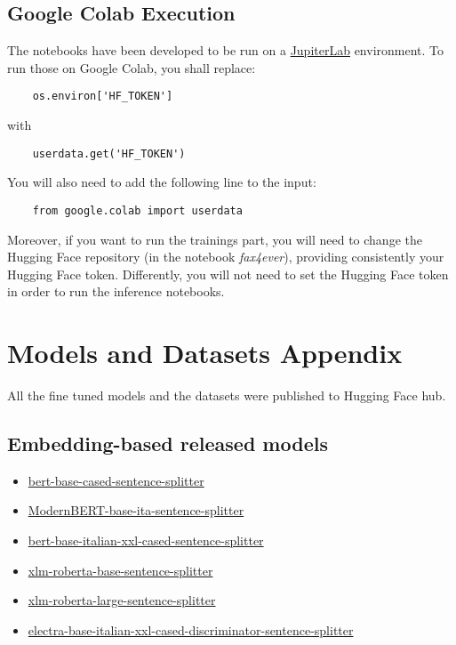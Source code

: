 \documentclass[11pt]{article}
\begin{document}
\subsection{Google Colab Execution}
The notebooks have been developed to be run on a \href{https://jupyterlab.readthedocs.io/en/latest/#}{JupiterLab}
environment. \newline To run those on Google Colab, you shall replace:
\begin{verbatim}
	os.environ['HF_TOKEN']
\end{verbatim}

with

\begin{verbatim}
	userdata.get('HF_TOKEN')
\end{verbatim}
You will also need to add the following line to the input:
\begin{verbatim}
	from google.colab import userdata
\end{verbatim}
Moreover, if you want to run the trainings part, you will need to change the Hugging Face repository (in the notebook \emph{fax4ever}),
providing consistently your Hugging Face token. 
Differently, you will not need to set the Hugging Face token in order to
run the inference notebooks.

\section{Models and Datasets Appendix}
\label{sec:appendix2}
All the fine tuned models and the datasets were published to Hugging Face hub.

\subsection{Embedding-based released models}

 \begin{itemize}
 \item \href{https://huggingface.co/fax4ever/bert-base-cased-sentence-splitter}{bert-base-cased-sentence-splitter}
 \item \href{https://huggingface.co/fax4ever/ModernBERT-base-ita-sentence-splitter}{ModernBERT-base-ita-sentence-splitter}
 \item \href{https://huggingface.co/fax4ever/bert-base-italian-xxl-cased-sentence-splitter}{bert-base-italian-xxl-cased-sentence-splitter}
 \item \href{https://huggingface.co/fax4ever/xlm-roberta-base-sentence-splitter}{xlm-roberta-base-sentence-splitter}
 \item \href{https://huggingface.co/fax4ever/xlm-roberta-large-sentence-splitter}{xlm-roberta-large-sentence-splitter}
 \item \href{https://huggingface.co/fax4ever/electra-base-italian-xxl-cased-discriminator-sentence-splitter}{electra-base-italian-xxl-cased-discriminator-sentence-splitter}
\end{itemize}
\end{document}

